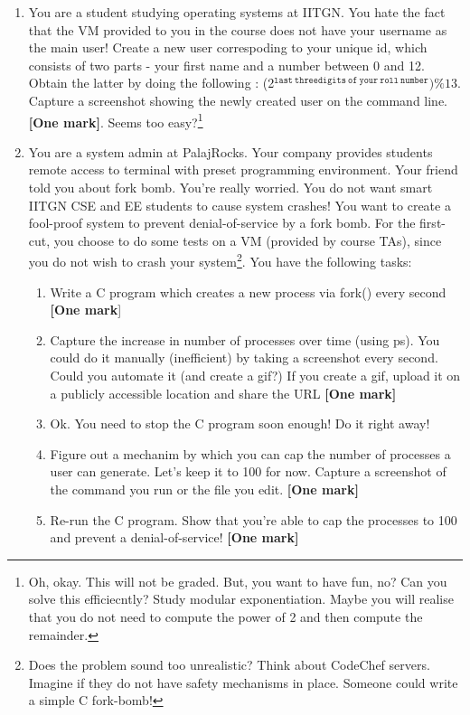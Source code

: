 \documentclass[]{article}
\begin{document}
\begin{enumerate}
	\item You are a student studying operating systems at IITGN. You hate the fact that the VM provided to you in the course does not have your username as the main user! Create a new user correspoding to your unique id, which consists of two parts - your first name and a number between 0 and 12. Obtain the latter by doing the following : (2$^\mathtt{last~three digits~of~your~roll~number})\%13$. Capture a screenshot showing the newly created user on the command line. \textbf{[One mark]}.
	 Seems too easy?\footnote{Oh, okay. This will not be graded. But, you want to have fun, no? Can you solve this efficiecntly? Study modular exponentiation. Maybe you will realise that you do not need to compute the power of 2 and then compute the remainder.}
	\item You are a system admin at PalajRocks. Your company provides students remote access to terminal with preset programming environment. Your friend told you about fork bomb. You're really worried. You do not want smart IITGN CSE and EE students to cause system crashes! You want to create a fool-proof system to prevent denial-of-service by a fork bomb. For the first-cut, you choose to do some tests on a VM (provided by course TAs), since you do not wish to crash your system\footnote{Does the problem sound too unrealistic? Think about CodeChef servers. Imagine if they do not have safety mechanisms in place. Someone could write a simple C fork-bomb!}. You have the following tasks:
	\begin{enumerate}
		\item Write a C program which creates a new process via fork() every second \textbf{[One mark}]
		\item Capture the increase in number of processes over time (using ps). You could do it manually (inefficient) by taking a screenshot every second. Could you automate it (and create a gif?) If you create a gif, upload it on a publicly accessible location and share the URL \textbf{[One mark]}
		\item Ok. You need to stop the C program soon enough! Do it right away! 
		\item Figure out a mechanim by which you can cap the number of processes a user can generate. Let's keep it to 100 for now. Capture a screenshot of the command you run or the file you edit. \textbf{[One mark]}
		\item Re-run the C program. Show that you're able to cap the processes to 100 and prevent a denial-of-service! \textbf{[One mark]}

\end{enumerate}
\end{enumerate}
\end{document}
